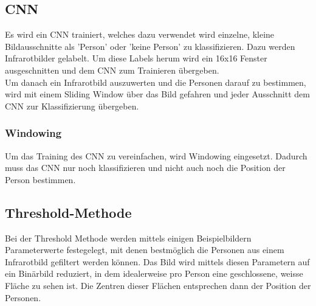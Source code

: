 \subsection{CNN}

Es wird ein \gls{CNN} trainiert, welches dazu verwendet wird einzelne, kleine Bildausschnitte als 'Person' oder 'keine Person' zu klassifizieren. Dazu werden Infrarotbilder gelabelt. Um diese Labels herum wird ein 16x16 Fenster ausgeschnitten und dem \gls{CNN} zum Trainieren übergeben.\\
Um danach ein Infrarotbild auszuwerten und die Personen darauf zu bestimmen, wird mit einem Sliding Window über das Bild gefahren und jeder Ausschnitt dem \gls{CNN} zur Klassifizierung übergeben.

\subsubsection{Windowing}
Um das Training des \gls{CNN} zu vereinfachen, wird Windowing eingesetzt. Dadurch muss das \gls{CNN} nur noch klassifizieren und nicht auch noch die Position der Person bestimmen.

\subsection{Threshold-Methode}

Bei der Threshold Methode werden mittels einigen Beispielbildern Parameterwerte festegelegt, mit denen bestmöglich die Personen aus einem Infrarotbild gefiltert werden können. Das Bild wird mittels diesen Parametern auf ein Binärbild reduziert, in dem idealerweise pro Person eine geschlossene, weisse Fläche zu sehen ist. Die Zentren dieser Flächen entsprechen dann der Position der Personen.